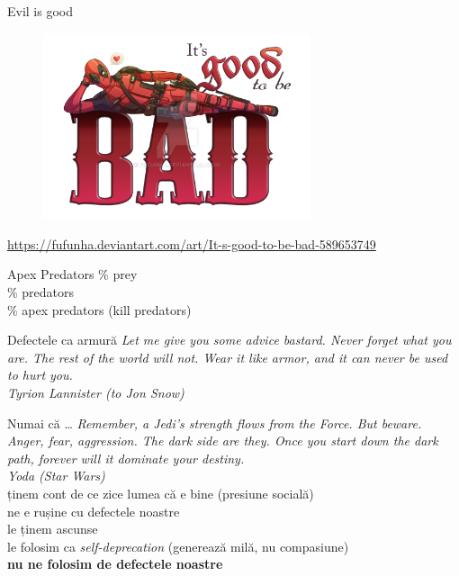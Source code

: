 \documentclass{beamer}
\begin{document}
\begin{frame}{Evil is good}
  \centering
  \begin{figure}
    \includegraphics[width=0.7\textwidth]{img/good-to-be-bad.png}
  \end{figure}
  \tiny \url{https://fufunha.deviantart.com/art/It-s-good-to-be-bad-589653749}
\end{frame}

\begin{frame}{Apex Predators}
  \centering
  \Large
  \% prey \\
  \% predators \\
  \% apex predators (kill predators)
\end{frame}

\begin{frame}{Defectele ca armură}
  \centering
  \pause \textit{Let me give you some advice bastard. Never forget what you are. The rest of the world will not. Wear it like armor, and it can never be used to hurt you.}\\
  \vspace{3mm}
  \hfill \textit{Tyrion Lannister (to Jon Snow)}
\end{frame}

\begin{frame}{Numai că \ldots}
  \centering
  \large
  \pause \textit{Remember, a Jedi's strength flows from the Force. But beware. Anger, fear, aggression. The dark side are they. Once you start down the dark path, forever will it dominate your destiny.} \\
  \vspace{3mm}
  \hfill \textit{Yoda (Star Wars)} \\
  \vspace{1cm}
  \pause ținem cont de ce zice lumea că e bine (presiune socială) \\
  \pause ne e rușine cu defectele noastre \\
  \pause le ținem ascunse \\
  \pause le folosim ca \textit{self-deprecation} (generează milă, nu compasiune) \\
  \pause \textbf{nu ne folosim de defectele noastre}
\end{frame}
\end{document}
